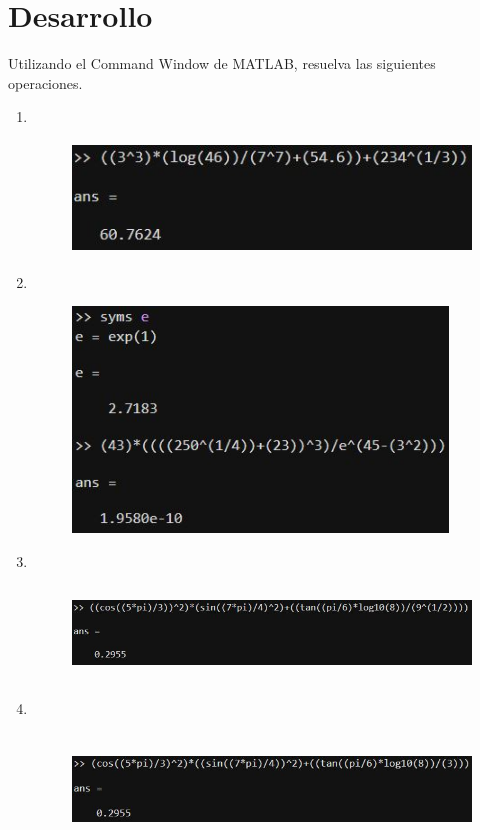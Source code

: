 \documentclass{article}
\begin{document}
\newpage

\section{Desarrollo}

Utilizando el Command Window de MATLAB, resuelva las siguientes operaciones.

\begin{enumerate}
    \item 
    \
    \begin{figure}[H]
    \centering
    \includegraphics[height=3cm]{img1.jpg}
    \end{figure}

    \item 
    \
    \begin{figure}[H]
    \centering
    \includegraphics[height=6cm]{img2.jpg}
    \end{figure}

    \item 
    \
    \begin{figure}[H]
    \centering
    \includegraphics[height=2.5cm]{img3.jpg}
    \end{figure}

    \item 
    \
    \begin{figure}[H]
    \centering
    \includegraphics[height=3cm]{img4.jpg}
    \end{figure}
    

\end{enumerate}
\end{document}

